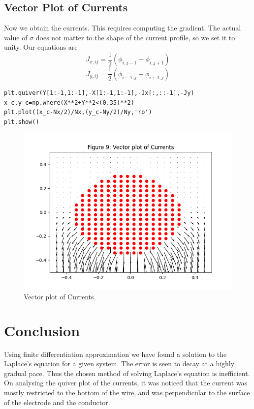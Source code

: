 \documentclass{article}
\begin{document}
\subsection{Vector Plot of Currents}
Now we obtain the currents. This requires computing the gradient. The actual value of $\sigma$ does not matter to
the shape of the current profile, so we set it to unity. Our equations are
\begin{equation*}
    J_{x,ij} = \frac{1}{2}(\phi_{i,j-1} - \phi_{i,j+1})
\end{equation*}
\begin{equation*}
    J_{y,ij} = \frac{1}{2}(\phi_{i-1,j} - \phi_{i+1,j})
\end{equation*}
\begin{lstlisting}
plt.quiver(Y[1:-1,1:-1],-X[1:-1,1:-1],-Jx[:,::-1],-Jy)
x_c,y_c=np.where(X**2+Y**2<(0.35)**2)
plt.plot((x_c-Nx/2)/Nx,(y_c-Ny/2)/Ny,'ro')
plt.show()

\end{lstlisting}
\begin{figure}[h!]
\centering
\includegraphics[scale=0.6]{9}
\caption{Vector plot of Currents}
\label{Vector plot of current flow}
\end{figure}


\section{Conclusion}
Using finite differentiation approximation we have found a solution to the
Laplace’s equation for a given system. The error is seen to decay at a
highly gradual pace. Thus the chosen method of solving Laplace’s equation
is inefficient. On analysing the quiver plot of the currents, it was noticed
that the current was mostly restricted to the bottom of the wire, and was
perpendicular to the surface of the electrode and the conductor.
\end{document}
